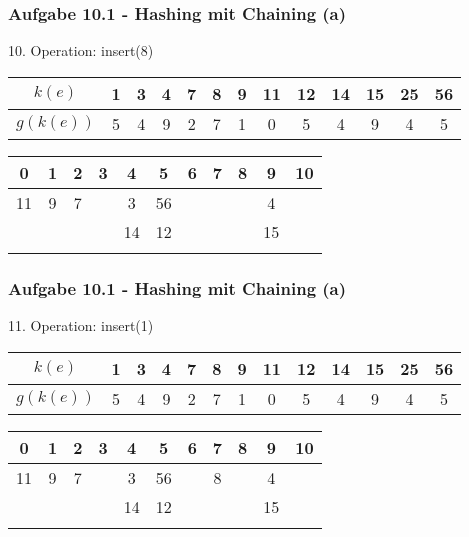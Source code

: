   \begin{frame}
    \frametitle{Aufgabe 10.1 - Hashing mit Chaining (a)}
    10. Operation: insert(8)
    \begin{center}
      \begin{tabular}{c|c|c|c|c|c|c|c|c|c|c|c|c}
        $k(e)$    & 1 & 3 & 4 & 7 & 8 & 9 & 11 & 12 & 14 & 15 & 25 & 56 \\
        \hline
        $g(k(e))$ & 5 & 4 & 9 & 2 & 7 & 1 & 0  & 5  & 4  & 9  & 4  & 5  \\
      \end{tabular}
  
      \bigskip
  
      \begin{tabular}{c|c|c|c|c|c|c|c|c|c|c}
        0  & 1 & 2 & 3 & 4  & 5  & 6 & 7 & 8 & 9  & 10 \\
        \hline
        11 & 9 & 7 &   & 3  & 56 &   &   &   & 4  &    \\
           &   &   &   & 14 & 12 &   &   &   & 15 &    \\
           &   &   &   &    &    &   &   &   &    &    \\
      \end{tabular}
    \end{center}
  \end{frame}
  
  \begin{frame}
    \frametitle{Aufgabe 10.1 - Hashing mit Chaining (a)}
    11. Operation: insert(1)
    \begin{center}
      \begin{tabular}{c|c|c|c|c|c|c|c|c|c|c|c|c}
        $k(e)$    & 1 & 3 & 4 & 7 & 8 & 9 & 11 & 12 & 14 & 15 & 25 & 56 \\
        \hline
        $g(k(e))$ & 5 & 4 & 9 & 2 & 7 & 1 & 0  & 5  & 4  & 9  & 4  & 5  \\
      \end{tabular}
  
      \bigskip
  
      \begin{tabular}{c|c|c|c|c|c|c|c|c|c|c}
        0  & 1 & 2 & 3 & 4  & 5  & 6 & 7 & 8 & 9  & 10 \\
        \hline
        11 & 9 & 7 &   & 3  & 56 &   & 8 &   & 4  &    \\
           &   &   &   & 14 & 12 &   &   &   & 15 &    \\
           &   &   &   &    &    &   &   &   &    &    \\
      \end{tabular}
    \end{center}
  \end{frame}
  
